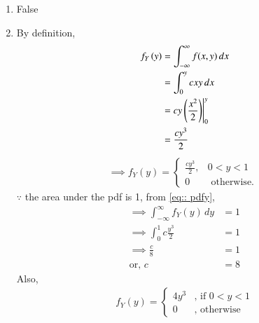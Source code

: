 \begin{enumerate}
    \item False
    \item By definition, 
    \begin{align}
        f_Y\left(y\right) &=  \int_{-\infty}^{\infty} f(x,y) \,dx \\
        &= \int_{0}^{y} cxy \,dx \\
        &= cy \left(\frac{x^2}{2}\right) \Biggr|_{0}^{y} \\
        &= \frac{ cy^3}{2}
    \end{align}
     \begin{align}
    \label{eq:: pdfy}
    \implies f_Y(y)  = 
    \begin{cases}
    \frac{ cy^3}{2}, &  0<y<1
    \\
    0 & \text{ otherwise. }
    \end{cases}
    \end{align}   
    $\because$ the area under the pdf is 1,  from \eqref{eq:: pdfy},
    \begin{align}
    \implies    \int_{-\infty}^{\infty} f_Y(y) \,dy &= 1 \\
    \implies        \int_{0}^{1} c\frac{y^3}{2} & =1 \\
    \implies    \frac{c}{8} &= 1 \\
    \text{or, }    c & = 8
    \end{align}
%
Also,
 \begin{align}
\label{eq:: pdf_y}
f_Y(y)  = 
\begin{cases}
 4y^3 & \text{, if } 0<y<1
\\
0 & \text{, otherwise }
\end{cases}
\end{align}   


\end{enumerate}
